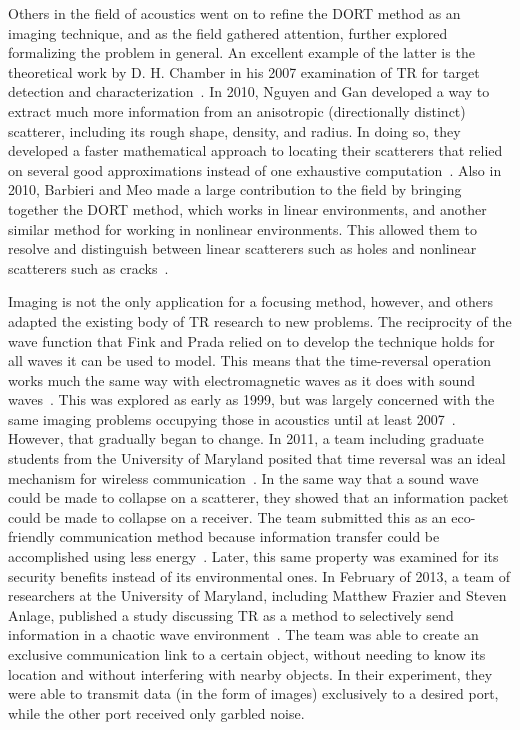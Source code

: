 Others in the field of acoustics went on to refine the DORT method as an imaging technique, and as the field gathered attention, further explored formalizing the problem in general. An excellent example of the latter is the theoretical work by D. H. Chamber in his 2007 examination of TR for target detection and characterization~\cite{chambers_target_2007}. In 2010, Nguyen and Gan developed a way to extract much more information from an anisotropic (directionally distinct) scatterer, including its rough shape, density, and radius. In doing so, they developed a faster mathematical approach to locating their scatterers that relied on several good approximations instead of one exhaustive computation~\cite{nguyen_dort_2010}. Also in 2010, Barbieri and Meo made a large contribution to the field by bringing together the DORT method, which works in linear environments, and another similar method for working in nonlinear environments. This allowed them to resolve and distinguish between linear scatterers such as holes and nonlinear scatterers such as cracks~\cite{barbieri_time_2010}.

Imaging is not the only application for a focusing method, however, and others adapted the existing body of TR research to new problems. The reciprocity of the wave function that Fink and Prada relied on to develop the technique holds for all waves it can be used to model. This means that the time-reversal operation works much the same way with electromagnetic waves as it does with sound waves~\cite{chambers_target_2007}. This was explored as early as 1999, but was largely concerned with the same imaging problems occupying those in acoustics until at least 2007~\cite{chambers_target_2007}. However, that gradually began to change. In 2011, a team including graduate students from the University of Maryland posited that time reversal was an ideal mechanism for wireless communication~\cite{wang_green_2011}. In the same way that a sound wave could be made to collapse on a scatterer, they showed that an information packet could be made to collapse on a receiver. The team submitted this as an eco-friendly communication method because information transfer could be accomplished using less energy~\cite{wang_green_2011}. Later, this same property was examined for its security benefits instead of its environmental ones. In February of 2013, a team of researchers at the University of Maryland, including Matthew Frazier and Steven Anlage, published a study discussing TR as a method to selectively send information in a chaotic wave environment~\cite{nltr-wave-chaotic,taddese_sensing_2010}. The team was able to create an exclusive communication link to a certain object, without needing to know its location and without interfering with nearby objects. In their experiment, they were able to transmit data (in the form of images) exclusively to a desired port, while the other port received only garbled noise.

